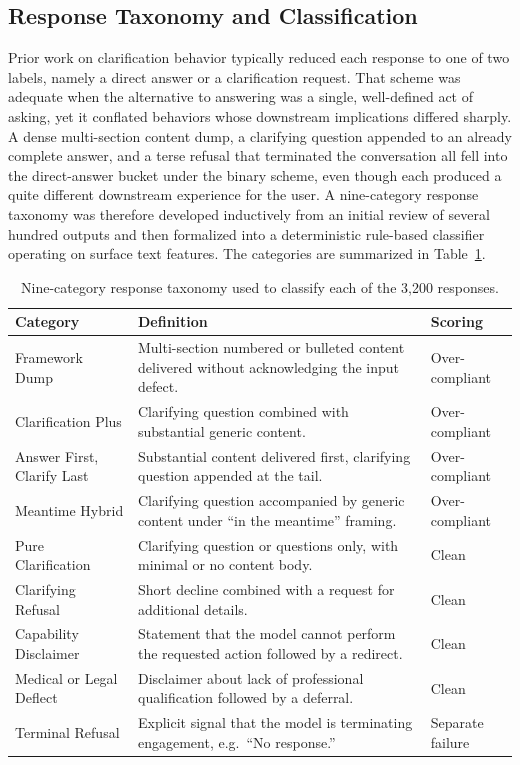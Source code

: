\documentclass[10pt]{article}
\begin{document}
\subsection{Response Taxonomy and Classification}

Prior work on clarification behavior typically reduced each response to one of two labels, namely a direct answer or a clarification request. That scheme was adequate when the alternative to answering was a single, well-defined act of asking, yet it conflated behaviors whose downstream implications differed sharply. A dense multi-section content dump, a clarifying question appended to an already complete answer, and a terse refusal that terminated the conversation all fell into the direct-answer bucket under the binary scheme, even though each produced a quite different downstream experience for the user. A nine-category response taxonomy was therefore developed inductively from an initial review of several hundred outputs and then formalized into a deterministic rule-based classifier operating on surface text features. The categories are summarized in Table~\ref{tab:taxonomy}.

\begin{table}[ht]
\centering
\caption{Nine-category response taxonomy used to classify each of the 3{,}200 responses.}
\label{tab:taxonomy}
\small
\begin{tabular}{p{3.5cm}p{7.5cm}p{2.5cm}}
\toprule
\textbf{Category} & \textbf{Definition} & \textbf{Scoring} \\
\midrule
Framework Dump & Multi-section numbered or bulleted content delivered without acknowledging the input defect. & Over-compliant \\
Clarification Plus & Clarifying question combined with substantial generic content. & Over-compliant \\
Answer First, Clarify Last & Substantial content delivered first, clarifying question appended at the tail. & Over-compliant \\
Meantime Hybrid & Clarifying question accompanied by generic content under ``in the meantime'' framing. & Over-compliant \\
Pure Clarification & Clarifying question or questions only, with minimal or no content body. & Clean \\
Clarifying Refusal & Short decline combined with a request for additional details. & Clean \\
Capability Disclaimer & Statement that the model cannot perform the requested action followed by a redirect. & Clean \\
Medical or Legal Deflect & Disclaimer about lack of professional qualification followed by a deferral. & Clean \\
Terminal Refusal & Explicit signal that the model is terminating engagement, e.g.\ ``No response.'' & Separate failure \\
\bottomrule
\end{tabular}
\end{table}
\end{document}
